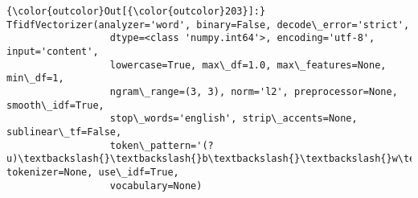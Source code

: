 \documentclass[11pt]{article}
\begin{document}
            \begin{Verbatim}[commandchars=\\\{\}]
{\color{outcolor}Out[{\color{outcolor}203}]:} TfidfVectorizer(analyzer='word', binary=False, decode\_error='strict',
                  dtype=<class 'numpy.int64'>, encoding='utf-8', input='content',
                  lowercase=True, max\_df=1.0, max\_features=None, min\_df=1,
                  ngram\_range=(3, 3), norm='l2', preprocessor=None, smooth\_idf=True,
                  stop\_words='english', strip\_accents=None, sublinear\_tf=False,
                  token\_pattern='(?u)\textbackslash{}\textbackslash{}b\textbackslash{}\textbackslash{}w\textbackslash{}\textbackslash{}w+\textbackslash{}\textbackslash{}b', tokenizer=None, use\_idf=True,
                  vocabulary=None)
\end{Verbatim}
        
\end{document}
